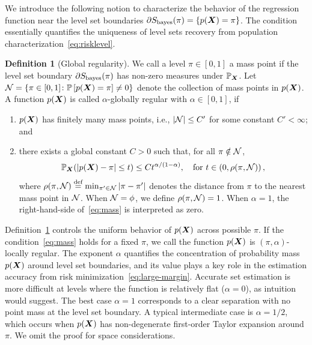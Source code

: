 \documentclass[11pt]{article}
\theoremstyle{definition}
\newtheorem{defn}{Definition}
\def\bayesS{S_{\textup{bayes}}}
\begin{document}
We introduce the following notion to characterize the behavior of the regression function near the level set boundaries $\partial S_{\text{bayes}}(\pi) = \{ p(\bm X)= \pi\}$. The condition essentially quantifies the uniqueness of level sets recovery from population characterization~\eqref{eq:risklevel}.

\begin{defn} [Global regularity]\label{ass:decboundary}We call a level $\pi\in[0,1]$ a mass point if the level set boundary $\partial \bayesS(\pi)$ has non-zero measures under $\mathbb{P}_{\bm X}$. Let $\mathcal{N}=\{\pi\in[0,1] \colon \mathbb{P}\left[p(\bm X)=\pi\right]\neq 0\}$ denote the collection of mass points in $p(\bm X)$. A function $p(\bm X)$ is called $\alpha$-globally regular with $\alpha\in[0,1]$, if 
\begin{enumerate}[label=(\roman*),wide, labelwidth=!, labelindent=0pt,topsep=-5pt,itemsep=-1ex,partopsep=0ex,parsep=1ex]
\item $p(\bm X)$ has finitely many mass points, i.e., $|\mathcal{N}|\leq C'$ for some constant $C'<\infty$; and 
\item 
there exists a global constant $C>0$ such that, for all $\pi \notin \mathcal{N} $,
\begin{equation}\label{eq:mass}
\mathbb{P}_{\bm X}(|p(\bm X)-\pi|\leq t)\leq Ct^{\alpha/(1-\alpha)}, \quad \text{for }t\in \left(0,\rho(\pi,\mathcal{N})\right),
\end{equation}
where $\rho(\pi,\mathcal{N})\stackrel{\text{def}}{=}\min_{\pi'\in \mathcal{N}} |\pi-\pi'|$  denotes the distance from $\pi$ to the nearest mass point in $\mathcal{N}$. When $\mathcal{N} = \phi$, we define $\rho(\pi,\mathcal{N})=1$. When $\alpha=1$, the right-hand-side of~\eqref{eq:mass} is interpreted as zero.
\end{enumerate}
\end{defn}

Definition~\ref{ass:decboundary} controls the uniform behavior of $p(\bm X)$ across possible $\pi$. If the condition~\eqref{eq:mass} holds for a fixed $\pi$, we call the function $p(\bm X)$ is $(\pi,\alpha)$-locally regular. The exponent $\alpha$ quantifies the concentration of probability mass $p(\bm X)$ around level set boundaries, and its value plays a key role in the estimation accuracy from risk minimization~\eqref{eq:large-margin}. Accurate set estimation is more difficult at levels where the function is relatively flat ($\alpha = 0$), as intuition would suggest. The best case $\alpha=1$ corresponds to a clear separation with no point mass at the level set boundary. A typical intermediate case is $\alpha=1/2$, which occurs when $p(\bm X)$ has non-degenerate first-order Taylor expansion around $\pi$. We omit the proof for space considerations.
\end{document}
